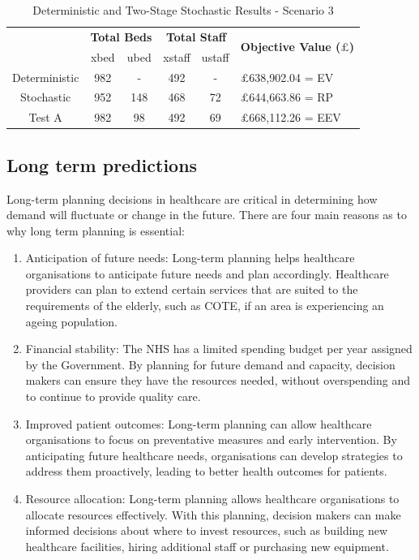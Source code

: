 \documentclass[../thesis.tex]{subfiles}
\begin{document}
\begin{table}[h!]
    \centering
    \begin{tabular}{cccccl}\toprule
 & \multicolumn{2}{l}{\textbf{Total Beds}} & \multicolumn{2}{c}{\textbf{Total Staff}} & \multirow{2}{*}{\textbf{Objective Value ($\pounds$)}}\\ \cmidrule(lr){2-3} \cmidrule(lr){4-5}
         
 & xbed           & ubed          & xstaff         & ustaff         \\ \midrule
 Deterministic & 982  & - & 492 & - &$\pounds$638,902.04 = EV \\
 Stochastic & 952 & 148 & 468 & 72 & $\pounds$644,663.86 = RP \\
 Test A & 982 & 98 & 492 & 69 & $\pounds$668,112.26 = EEV \\\bottomrule
    \end{tabular}
    \caption{Deterministic and Two-Stage Stochastic Results - Scenario 3}
    \label{tab:Scenario3Results}
\end{table}

\subsection{Long term predictions}\label{sec:scenario4}
Long-term planning decisions in healthcare are critical in determining how demand will fluctuate or change in the future. There are four main reasons as to why long term planning is essential:
\begin{enumerate}
    \item Anticipation of future needs: Long-term planning helps healthcare organisations to anticipate future needs and plan accordingly. Healthcare providers can plan to extend certain services that are suited to the requirements of the elderly, such as COTE, if an area is experiencing an ageing population.
    \item Financial stability: The NHS has a limited spending budget per year assigned by the Government. By planning for future demand and capacity, decision makers can ensure they have the resources needed, without overspending and to continue to provide quality care.
    \item Improved patient outcomes: Long-term planning can allow healthcare organisations to focus on preventative measures and early intervention. By anticipating future healthcare needs, organisations can develop strategies to address them proactively, leading to better health outcomes for patients.
    \item Resource allocation: Long-term planning allows healthcare organisations to allocate resources effectively. With this planning, decision makers can make informed decisions about where to invest resources, such as building new healthcare facilities, hiring additional staff or purchasing new equipment.
\end{enumerate}
\end{document}
